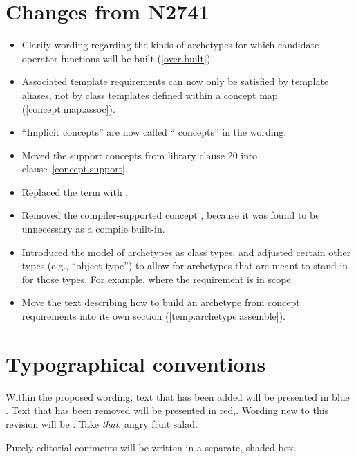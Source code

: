 \documentclass[american]{book}
\newcommand{\editorial}[1]{\colorbox{editbackground}{\begin{minipage}{\linewidth
}#1\end{minipage}}}
\begin{document}
\begin{titlepage}
\section*{Changes from N2741}
\begin{itemize}
\item Clarify wording regarding the kinds of
  archetypes for which candidate operator functions will be built
  (\mbox{\ref{over.built}}).
\item Associated template requirements can now only be satisfied by
  template aliases, not by class templates defined within a concept
  map (\ref{concept.map.assoc}).
\item ``Implicit concepts'' are now called `` concepts'' in the wording.
\item Moved the support concepts from library clause 20 into
  clause~\ref{concept.support}.
\item Replaced the term  with .
\item Removed the compiler-supported concept , because it was found to be unnecessary as a compile built-in.
\item Introduced the model of archetypes as class types, and adjusted certain other types (e.g., ``object type'') to allow for archetypes that are meant to stand in for those types. For example,  where the requirement  is in scope.
\item Move the text describing how to build an archetype from concept requirements into its own section (\ref{temp.archetype.assemble}).
\end{itemize}

\section*{Typographical conventions}
Within the proposed wording, text that has been added
\textcolor{addclr}{will be presented in blue} . Text that has been removed will be
presented \textcolor{remclr}{in red},. Wording new to this revision will be 
. Take \emph{that}, angry fruit salad.

\editorial{Purely editorial comments will be written in a separate,
  shaded box.}
\end{titlepage}

\pagestyle{fancy}
\fancyhead[LE,RO]{\textbf{\rightmark}}
\fancyhead[RE]{\textbf{\leftmark\hspace{1em}\thepage}}
\fancyhead[LO]{\textbf{\thepage\hspace{1em}\leftmark}}
\end{document}
